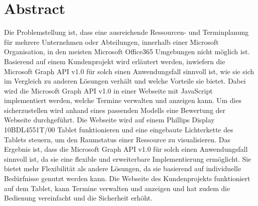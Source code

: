 \section*{Abstract}\label{sec:Abstract}
Die Problemstellung ist, dass eine ausreichende Ressourcen- und Terminplanung für mehrere Unternehmen oder Abteilungen, innerhalb einer Microsoft Organisation, in den meisten Microsoft Office365 Umgebungen nicht möglich ist.
Basierend auf einem Kundenprojekt wird erläutert werden, inwiefern die Microsoft Graph API v1.0 für solch einen Anwendungsfall sinnvoll ist, wie sie sich im Vergleich zu anderen Lösungen verhält und welche Vorteile sie bietet.
Dabei wird die Microsoft Graph API v1.0 in einer Webseite mit JavaScript implementiert werden, welche Termine verwalten und anzeigen kann.
Um dies sicherzustellen wird anhand eines passenden Modells eine Bewertung der Webseite durchgeführt.
Die Webseite wird auf einem Phillips Display 10BDL4551T/00 Tablet funktionieren und eine eingebaute Lichterkette des Tablets steuern, um den Raumstatus einer Ressource zu visualisieren.
Das Ergebnis ist, dass die Microsoft Graph API v1.0 für solch einen Anwendungsfall sinnvoll ist, da sie eine flexible und erweiterbare Implementierung ermöglicht.
Sie bietet mehr Flexibilität als andere Lösungen, da sie basierend auf individuelle Bedürfnisse genutzt werden kann.
Die Webseite des Kundenprojekts funktioniert auf dem Tablet, kann Termine verwalten und anzeigen und hat zudem die Bedienung vereinfacht und die Sicherheit erhöht.
\newpage